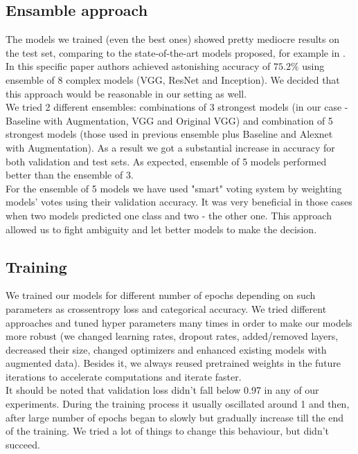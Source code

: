 \subsection{Ensamble approach}

The models we trained (even the best ones) showed pretty mediocre results on the test set, comparing to the state-of-the-art models proposed, for example in \cite{ferSOTA}. In this specific paper authors achieved astonishing accuracy of $75.2\%$ using ensemble of 8 complex models (VGG, ResNet and Inception). We decided that this approach would be reasonable in our setting as well.\\

We tried 2 different ensembles: combinations of 3 strongest models (in our case - Baseline with Augmentation, VGG and Original VGG) and combination of 5 strongest models (those used in previous ensemble plus Baseline and Alexnet with Augmentation). As a result we got a substantial increase in accuracy for both validation and test sets. As expected, ensemble of 5 models performed better than the ensemble of 3. \\

For the ensemble of 5 models we have used "smart" voting system by weighting models' votes using their validation accuracy. It was very beneficial in those cases when two models predicted one class and two - the other one. This approach allowed us to fight ambiguity and let better models to make the decision.\\

\subsection{Training}

We trained our models for different number of epochs depending on such parameters as crossentropy loss and categorical accuracy. We tried different approaches and tuned hyper parameters many times in order to make our models more robust (we changed learning rates, dropout rates, added/removed layers, decreased their size, changed optimizers and enhanced existing models with augmented data). Besides it, we always reused pretrained weights in the future iterations to accelerate computations and iterate faster.\\

It should be noted that validation loss didn't fall below 0.97 in any of our experiments. During the training process it usually oscillated around 1 and then, after large number of epochs began to slowly but gradually increase till the end of the training. We tried a lot of things to change this behaviour, but didn't succeed.

